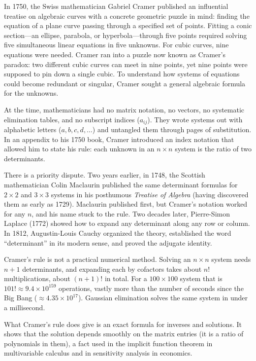\begin{historybox}
In 1750, the Swiss mathematician Gabriel Cramer published an influential treatise on algebraic curves with a concrete geometric puzzle in mind: finding the equation of a plane curve passing through a specified set of points. Fitting a conic section---an ellipse, parabola, or hyperbola---through five points required solving five simultaneous linear equations in five unknowns. For cubic curves, nine equations were needed. Cramer ran into a puzzle now known as Cramer's paradox: two different cubic curves can meet in nine points, yet nine points were supposed to pin down a single cubic. To understand how systems of equations could become redundant or singular, Cramer sought a general algebraic formula for the unknowns.

At the time, mathematicians had no matrix notation, no vectors, no systematic elimination tables, and no subscript indices ($a_{ij}$). They wrote systems out with alphabetic letters ($a, b, c, d, \dots$) and untangled them through pages of substitution. In an appendix to his 1750 book, Cramer introduced an index notation that allowed him to state his rule: each unknown in an $n\times n$ system is the ratio of two determinants.

There is a priority dispute. Two years earlier, in 1748, the Scottish mathematician Colin Maclaurin published the same determinant formulas for $2\times2$ and $3\times3$ systems in his posthumous \emph{Treatise of Algebra} (having discovered them as early as 1729). Maclaurin published first, but Cramer's notation worked for any $n$, and his name stuck to the rule. Two decades later, Pierre-Simon Laplace (1772) showed how to expand any determinant along any row or column. In 1812, Augustin-Louis Cauchy organized the theory, established the word ``determinant'' in its modern sense, and proved the adjugate identity.

Cramer's rule is not a practical numerical method. Solving an $n\times n$ system needs $n+1$ determinants, and expanding each by cofactors takes about $n!$ multiplications, about $(n+1)!$ in total. For a $100\times 100$ system that is $101! \approx 9.4 \times 10^{159}$ operations, vastly more than the number of seconds since the Big Bang ($\approx 4.35 \times 10^{17}$). Gaussian elimination solves the same system in under a millisecond.

What Cramer's rule does give is an exact formula for inverses and solutions. It shows that the solution depends smoothly on the matrix entries (it is a ratio of polynomials in them), a fact used in the implicit function theorem in multivariable calculus and in sensitivity analysis in economics.
\end{historybox}

